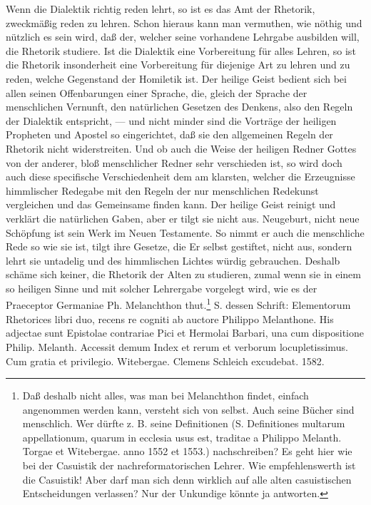 Wenn die Dialektik richtig reden lehrt, so ist es das Amt der Rhetorik, zweckmäßig reden zu lehren. Schon hieraus kann man vermuthen, wie nöthig und nützlich es sein wird, daß der, welcher seine vorhandene Lehrgabe ausbilden will, die Rhetorik studiere. Ist die Dialektik eine Vorbereitung für alles Lehren, so ist die Rhetorik insonderheit eine Vorbereitung für diejenige Art zu lehren und zu reden, welche Gegenstand der Homiletik ist. Der heilige Geist bedient sich bei allen seinen Offenbarungen einer Sprache, die, gleich der Sprache der menschlichen Vernunft, den natürlichen Gesetzen des Denkens, also den Regeln der Dialektik entspricht, — und nicht
minder sind die Vorträge der heiligen Propheten und Apostel so eingerichtet, daß sie den allgemeinen Regeln der Rhetorik nicht widerstreiten. Und ob auch die Weise der heiligen Redner Gottes von der anderer, bloß menschlicher Redner sehr verschieden ist, so wird doch auch diese specifische Verschiedenheit dem am klarsten, welcher die Erzeugnisse himmlischer Redegabe mit den Regeln der nur menschlichen Redekunst vergleichen und das Gemeinsame finden kann. Der heilige Geist reinigt und verklärt die natürlichen Gaben, aber er tilgt sie nicht aus. Neugeburt, nicht neue Schöpfung ist sein Werk im Neuen Testamente. So nimmt er auch die menschliche Rede so wie sie ist, tilgt ihre Gesetze, die Er selbst gestiftet, nicht aus, sondern lehrt sie untadelig und des himmlischen Lichtes würdig gebrauchen. Deshalb schäme sich keiner, die Rhetorik der Alten zu studieren, zumal wenn sie in einem so heiligen Sinne und mit solcher Lehrergabe vorgelegt wird, wie es der Praeceptor Germaniae Ph. Melanchthon thut.\footnote{Daß deshalb nicht alles, was man bei Melanchthon findet, einfach angenommen werden kann, versteht sich von selbst. Auch seine Bücher sind menschlich. Wer dürfte z. B. seine Definitionen (S. Definitiones multarum appellationum, quarum in ecclesia usus est, traditae a Philippo Melanth. Torgae et Witebergae. anno 1552 et 1553.) nachschreiben? Es geht hier wie bei der Casuistik der nachreformatorischen Lehrer. Wie empfehlenswerth ist die Casuistik! Aber darf man sich denn wirklich auf alle alten casuistischen Entscheidungen verlassen? Nur der Unkundige könnte ja antworten.} S. dessen Schrift: Elementorum Rhetorices libri duo, recens re%
cogniti ab auctore Philippo Melanthone. His adjectae sunt Epistolae contrariae Pici et Hermolai Barbari, una cum dispositione Philip. Melanth. Accessit demum Index et rerum et verborum locupletissimus. Cum gratia et privilegio. Witebergae. Clemens Schleich excudebat. 1582.

